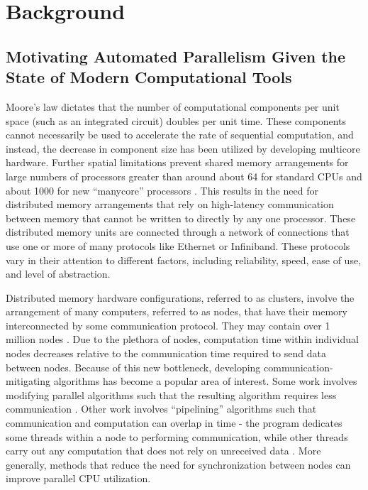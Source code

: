 \chapter{Background}

\section{Motivating Automated Parallelism Given the State of Modern
Computational Tools}
Moore's law dictates that the number of computational components per unit space
(such as an integrated circuit) doubles per unit time. These components cannot
necessarily be used to accelerate the rate of sequential computation, and
instead, the decrease in component size has been utilized by developing
multicore hardware. Further spatial limitations prevent shared memory
arrangements for large numbers of processors greater than around about 64 for
standard CPUs and about 1000 for new ``manycore'' processors \cite{manycore}.
This results in the need for distributed memory arrangements that rely on
high-latency communication between memory that cannot be written to directly by
any one processor. These distributed memory units are connected through a
network of connections that use one or more of many protocols like Ethernet or
Infiniband. These protocols vary in their attention to different factors,
including reliability, speed, ease of use, and level of abstraction.

Distributed memory hardware configurations, referred to as clusters, involve the
arrangement of many computers, referred to as nodes, that have their memory
interconnected by some communication protocol. They may contain over 1 million
nodes \cite{top500}. Due to the plethora of nodes, computation time within
individual nodes decreases relative to the communication time required to send
data between nodes. Because of this new bottleneck, developing
communication-mitigating algorithms has become a popular area of interest. Some
work involves modifying parallel algorithms such that the resulting algorithm
requires less communication \cite{strassen_comm_opt}. Other work involves
``pipelining'' algorithms such that communication and computation can overlap in
time \-- the program dedicates some threads within a node to performing
communication, while other threads carry out any computation that does not rely
on unreceived data \cite{gmres_pipe}.  More generally, methods that reduce the
need for synchronization between nodes can improve parallel CPU utilization.

